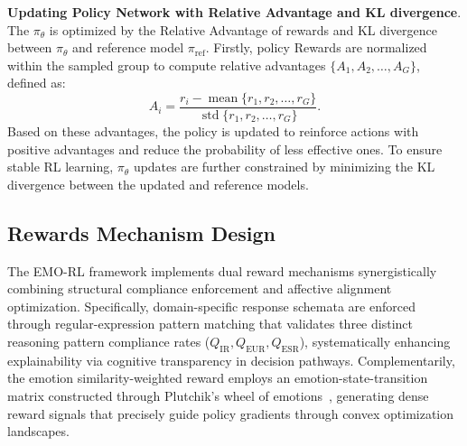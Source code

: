 \documentclass[11pt]{article}
\begin{document}
\textbf{Updating Policy Network with Relative Advantage and KL divergence}. The $\pi_{\theta}$ is optimized by the Relative Advantage of rewards and KL divergence between $\pi_{\theta}$ and reference model $\pi_{\mathrm{ref}}$. Firstly, policy Rewards are normalized within the sampled group to compute relative advantages $\{A_{1},A_{2},\dotsc,A_{G}\}$, defined as:
\begin{equation}
	A_{i}={\frac{r_{i}-\operatorname*{mean}\{r_{1},r_{2},\ldots,r_{G}\}}{\operatorname{std}\{r_{1},r_{2},\ldots,r_{G}\}}}.
\end{equation}
Based on these advantages, the policy is updated to reinforce actions with positive advantages and reduce the probability of less effective ones. To ensure stable RL learning, $\pi_{\theta}$ updates are further constrained by minimizing the KL divergence between the updated and reference models.


\subsection{Rewards Mechanism Design}
The EMO-RL framework implements dual reward mechanisms synergistically combining structural compliance enforcement and affective alignment optimization.
Specifically, domain-specific response schemata are enforced through regular-expression pattern matching that validates three distinct reasoning pattern compliance rates ($Q_{\text{IR}}, Q_{\text{EUR}}, Q_{\text{ESR}}$), systematically enhancing explainability via cognitive transparency in decision pathways.
Complementarily, the emotion similarity-weighted reward employs an emotion-state-transition matrix constructed through Plutchik's wheel of emotions~\cite{plutchik1982psychoevolutionary}, generating dense reward signals that precisely guide policy gradients through convex optimization landscapes.
\end{document}
